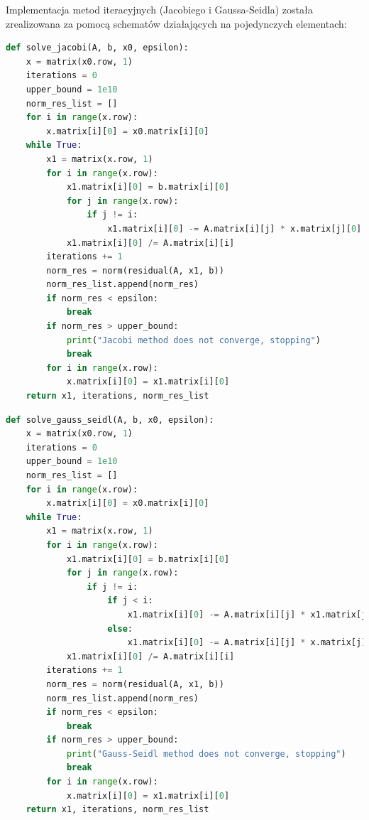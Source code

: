 \documentclass{article}
\begin{document}
Implementacja metod iteracyjnych (Jacobiego i Gaussa-Seidla) została zrealizowana za pomocą schematów działających na pojedynczych elementach:

\vspace{0.5em}
\begin{lstlisting}[language=Python, caption=Implementacja metody Jacobiego]
def solve_jacobi(A, b, x0, epsilon):
    x = matrix(x0.row, 1)
    iterations = 0
    upper_bound = 1e10
    norm_res_list = []
    for i in range(x.row):
        x.matrix[i][0] = x0.matrix[i][0]
    while True:
        x1 = matrix(x.row, 1)
        for i in range(x.row):
            x1.matrix[i][0] = b.matrix[i][0]
            for j in range(x.row):
                if j != i:
                    x1.matrix[i][0] -= A.matrix[i][j] * x.matrix[j][0]
            x1.matrix[i][0] /= A.matrix[i][i]
        iterations += 1
        norm_res = norm(residual(A, x1, b))
        norm_res_list.append(norm_res)
        if norm_res < epsilon:
            break
        if norm_res > upper_bound:
            print("Jacobi method does not converge, stopping")
            break
        for i in range(x.row):
            x.matrix[i][0] = x1.matrix[i][0]
    return x1, iterations, norm_res_list
\end{lstlisting}
\begin{lstlisting}[language=Python, caption=Implementacja metody Gaussa-Seidla]
def solve_gauss_seidl(A, b, x0, epsilon):
    x = matrix(x0.row, 1)
    iterations = 0
    upper_bound = 1e10
    norm_res_list = []
    for i in range(x.row):
        x.matrix[i][0] = x0.matrix[i][0]
    while True:
        x1 = matrix(x.row, 1)
        for i in range(x.row):
            x1.matrix[i][0] = b.matrix[i][0]
            for j in range(x.row):
                if j != i:
                    if j < i:
                        x1.matrix[i][0] -= A.matrix[i][j] * x1.matrix[j][0]
                    else:
                        x1.matrix[i][0] -= A.matrix[i][j] * x.matrix[j][0]
            x1.matrix[i][0] /= A.matrix[i][i]
        iterations += 1
        norm_res = norm(residual(A, x1, b))
        norm_res_list.append(norm_res)
        if norm_res < epsilon:
            break
        if norm_res > upper_bound:
            print("Gauss-Seidl method does not converge, stopping")
            break
        for i in range(x.row):
            x.matrix[i][0] = x1.matrix[i][0]
    return x1, iterations, norm_res_list
\end{lstlisting}
\vspace{1.25em}
\end{document}
